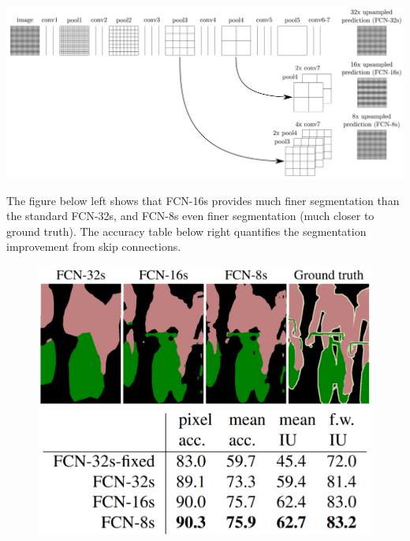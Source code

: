 \documentclass{article}
\begin{document}
\begin{center}
\includegraphics[scale=0.45]{skipconnections.PNG}
\end{center}

The figure below left shows that FCN-16s provides much finer segmentation than the standard FCN-32s, and FCN-8s even finer segmentation (much closer to ground truth). The accuracy table below right quantifies the segmentation improvement from skip connections.


\begin{figure}[htbp]
    \centering
    \begin{minipage}{0.5\textwidth}
        \centering
        \includegraphics[width=1.0\textwidth]{fcnresults.PNG} %
    \end{minipage}\hfill
    \begin{minipage}{0.4\textwidth}
        \centering
        \includegraphics[width=1\textwidth]{fcntable.PNG} %
    \end{minipage}
\end{figure}
\end{document}
